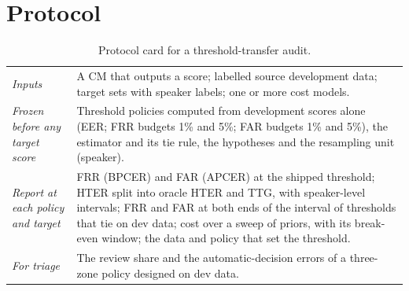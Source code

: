 \documentclass[journal]{IEEEtran}
\begin{document}
\section{Protocol}
\label{sec:protocol}

\begin{table}[!t]
\caption{Protocol card for a threshold-transfer audit.}
\label{tab:card}
\centering
\footnotesize
\setlength{\tabcolsep}{3pt}
\begin{tabular}{@{}p{}p{}@{}}
\toprule
\emph{Inputs} & A CM that outputs a score; labelled source development data; target sets with speaker labels; one or more cost
models. \\
\emph{Frozen before any target score} & Threshold policies computed from development scores alone (EER; FRR budgets 1\% and
5\%; FAR budgets 1\% and 5\%), the estimator and its tie rule, the hypotheses and the resampling unit (speaker). \\
\emph{Report at each policy and target} & FRR (BPCER) and FAR (APCER) at the shipped threshold; HTER split into oracle HTER
and TTG, with speaker-level intervals; FRR and FAR at both ends of the interval of thresholds that tie on dev data; cost over
a sweep of priors, with its break-even window; the data and policy that set the threshold. \\
\emph{For triage} & The review share and the automatic-decision errors of a three-zone policy designed on dev data. \\
\bottomrule
\end{tabular}
\end{table}
\end{document}
